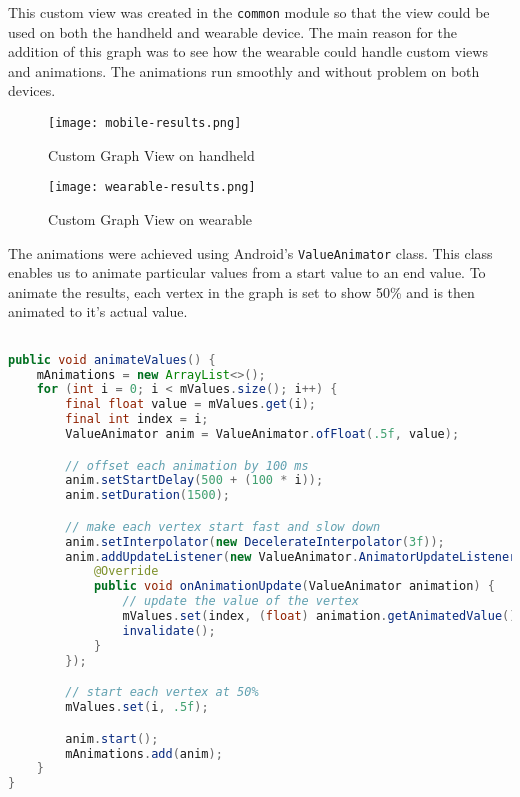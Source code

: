This custom view was created in the \texttt{common} module so that the view
could be used on both the handheld and wearable device. The main reason for
the addition of this graph was to see how the wearable could handle custom views
and animations. The animations run smoothly and without problem on both devices.


\begin{figure}
    \centering
    \texttt{[image: mobile-results.png]}
    \caption{Custom Graph View on handheld}
    \label{fig:mobile_results}
\end{figure}

\begin{figure}
    \centering
    \texttt{[image: wearable-results.png]}
    \caption{Custom Graph View on wearable}
    \label{fig:wearable_results}
\end{figure}

The animations were achieved using Android's \texttt{ValueAnimator} class. This
class enables us to animate particular values from a start value to an end
value. To animate the results, each vertex in the graph is set to show 50\% and
is then animated to it's actual value.

\begin{lstlisting}[language=Java]

public void animateValues() {
    mAnimations = new ArrayList<>();
    for (int i = 0; i < mValues.size(); i++) {
        final float value = mValues.get(i);
        final int index = i;
        ValueAnimator anim = ValueAnimator.ofFloat(.5f, value);

        // offset each animation by 100 ms
        anim.setStartDelay(500 + (100 * i));
        anim.setDuration(1500);

        // make each vertex start fast and slow down
        anim.setInterpolator(new DecelerateInterpolator(3f));
        anim.addUpdateListener(new ValueAnimator.AnimatorUpdateListener() {
            @Override
            public void onAnimationUpdate(ValueAnimator animation) {
                // update the value of the vertex
                mValues.set(index, (float) animation.getAnimatedValue());
                invalidate();
            }
        });

        // start each vertex at 50%
        mValues.set(i, .5f);

        anim.start();
        mAnimations.add(anim);
    }
}

\end{lstlisting}

